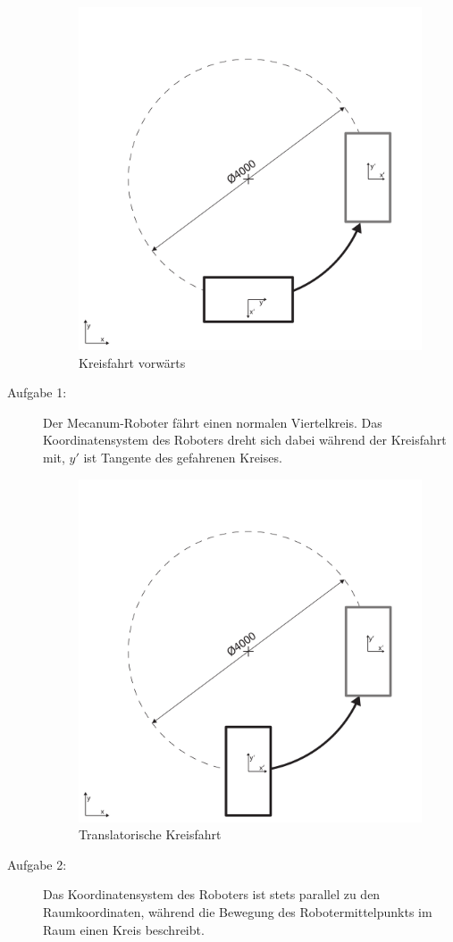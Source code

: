 \begin{description}
    \begin{figure}[H]
        \centering
        \includegraphics[width=.6\textwidth]{Abbildungen/Viertelkreis-vorwaerts}
        \caption{Kreisfahrt vorwärts}
        \label{fig:kreis-vorwaerts}
    \end{figure}
    \item[Aufgabe 1:]
    Der Mecanum-Roboter fährt einen normalen Viertelkreis. Das Koordinatensystem des Roboters dreht sich dabei während der Kreisfahrt mit, $y'$ ist Tangente des gefahrenen Kreises.

    \begin{figure}[H]
        \centering
        \includegraphics[width=.6\textwidth]{Abbildungen/Viertelkreis-translatorisch}
        \caption{Translatorische Kreisfahrt}
        \label{fig:kreis-translatorisch}
    \end{figure}
    \item[Aufgabe 2:]
    Das Koordinatensystem des Roboters ist stets parallel zu den Raumkoordinaten, während die Bewegung des Robotermittelpunkts im Raum einen Kreis beschreibt.


\end{description}
